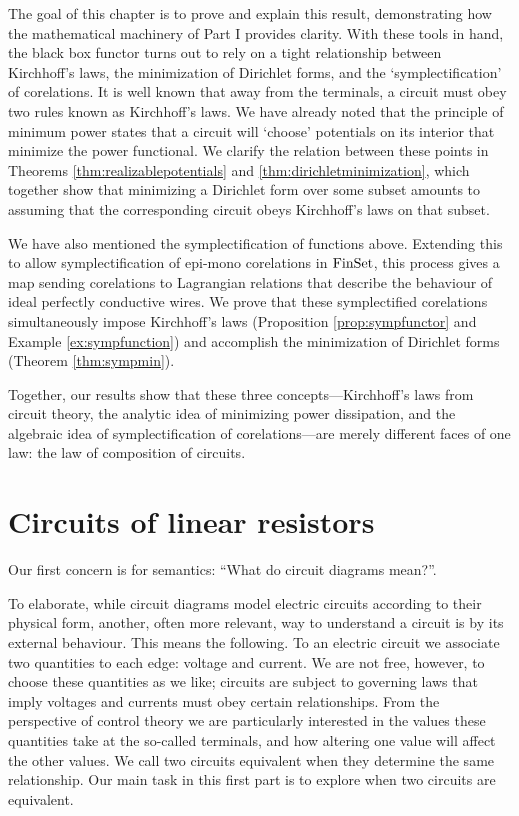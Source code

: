 The goal of this chapter is to prove and explain this result, demonstrating how
the mathematical machinery of Part I provides clarity. With these tools in hand,
the black box functor turns out to rely on a tight relationship between
Kirchhoff's laws, the minimization of Dirichlet forms, and the
`symplectification' of corelations. It is well known that away from the
terminals, a circuit must obey two rules known as Kirchhoff's laws.  We have
already noted that the principle of minimum power states that a circuit will
`choose' potentials on its interior that minimize the power functional.  We
clarify the relation between these points in Theorems
\ref{thm:realizablepotentials} and \ref{thm:dirichletminimization}, which
together show that minimizing a Dirichlet form over some subset amounts to
assuming that the corresponding circuit obeys Kirchhoff's laws on that subset.

We have also mentioned the symplectification of functions above.  Extending this
to allow symplectification of epi-mono corelations in $\mathrm{FinSet}$, this process
gives a map sending corelations to Lagrangian relations that describe the
behaviour of ideal perfectly conductive wires.  We prove that these
symplectified corelations simultaneously impose Kirchhoff's laws (Proposition
\ref{prop:sympfunctor} and Example \ref{ex:sympfunction}) and accomplish the
minimization of Dirichlet forms (Theorem \ref{thm:sympmin}).  

Together, our results show that these three concepts---Kirchhoff's laws from
circuit theory, the analytic idea of minimizing power dissipation, and the
algebraic idea of symplectification of corelations---are merely different faces
of one law: the law of composition of circuits.

\section{Circuits of linear resistors} \label{sec:resistors}
Our first concern is for semantics: ``What do circuit diagrams mean?''. 

To elaborate, while circuit diagrams model electric circuits according to their
physical form, another, often more relevant, way to understand a circuit is by
its external behaviour. This means the following. To an electric circuit we
associate two quantities to each edge: voltage and current. We are not free,
however, to choose these quantities as we like; circuits are subject to
governing laws that imply voltages and currents must obey certain relationships.
From the perspective of control theory we are particularly interested in the
values these quantities take at the so-called terminals, and how altering one
value will affect the other values. We call two circuits equivalent when they
determine the same relationship. Our main task in this first part is to explore
when two circuits are equivalent.

